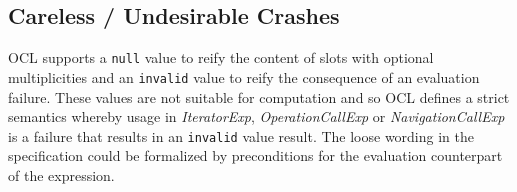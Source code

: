 \documentclass[
]{ceurart}
\begin{document}








\subsection{Careless / Undesirable Crashes}

OCL supports a \verb|null| value to reify the content of slots with optional multiplicities and an \verb|invalid| value to reify the consequence of an evaluation failure. These values are not suitable for computation and so OCL defines a strict semantics whereby usage in \emph{IteratorExp}, \emph{OperationCallExp} or \emph{NavigationCallExp} is a failure that results in an \verb|invalid| value result.
The loose wording in the specification could be formalized by preconditions for the evaluation counterpart of the expression.
\end{document}
